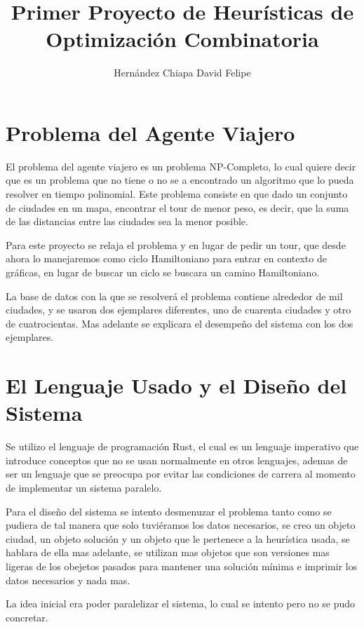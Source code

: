 \documentclass[12pt]{article}
\begin{document}
\title{Primer Proyecto de Heurísticas de Optimización Combinatoria}
\author{Hernández Chiapa David Felipe}
\maketitle
\section{Problema del Agente Viajero}
El problema del agente viajero es un problema NP-Completo, lo cual quiere decir que es un problema que no tiene o no se a encontrado un algoritmo que lo pueda resolver en tiempo polinomial. Este problema consiste en que dado un conjunto de ciudades en un mapa, encontrar el tour de menor peso, es decir, que la suma de las distancias entre las ciudades sea la menor posible.

Para este proyecto se relaja el problema y en lugar de pedir un tour, que desde ahora lo manejaremos como ciclo Hamiltoniano para entrar en contexto de gráficas, en lugar de buscar un ciclo se buscara un camino Hamiltoniano.

La base de datos con la que se resolverá el problema contiene alrededor de mil ciudades, y se usaron dos ejemplares diferentes, uno de cuarenta ciudades y otro de cuatrocientas. Mas adelante se explicara el desempeño del sistema con los dos ejemplares.

\section{El Lenguaje Usado y el Diseño del Sistema}

Se utilizo el lenguaje de programación Rust, el cual es un lenguaje imperativo que introduce conceptos que no se usan normalmente en otros lenguajes, ademas de ser un lenguaje que se preocupa por evitar las condiciones de carrera al momento de implementar un sistema paralelo.

Para el diseño del sistema se intento desmenuzar el problema tanto como se pudiera de tal manera que solo tuviéramos los datos necesarios, se creo un objeto ciudad, un objeto solución y un objeto que le pertenece a la heurística usada, se hablara de ella mas adelante, se utilizan mas objetos que son versiones mas ligeras de los obejetos pasados para mantener una solución mínima e imprimir los datos necesarios y nada mas.

La idea inicial era poder paralelizar el sistema, lo cual se intento pero no se pudo concretar.
\end{document}
